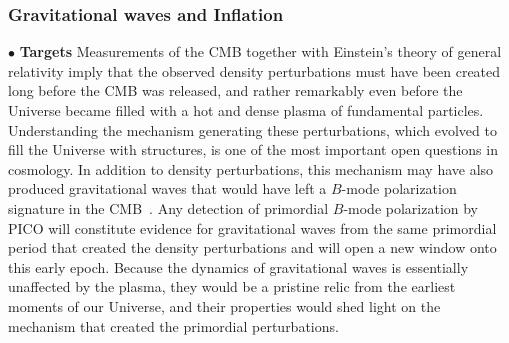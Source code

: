 \documentclass[PICOReport.tex]{subfiles}
\begin{document}
\subsubsection{Gravitational waves and Inflation}
\label{sec:inflation}

\noindent$\bullet$ {\bf Targets} \hspace{0.1in} Measurements of the \ac{CMB} together with Einstein's theory of general relativity imply that the observed density perturbations must have been created long before the \ac{CMB} was released, and rather remarkably even before the Universe became filled with a hot and dense plasma of fundamental particles. Understanding the mechanism generating these perturbations, which evolved to fill the Universe with structures, is one of the most important open questions in cosmology. In addition to density perturbations, this mechanism may have also produced gravitational waves that would have left a $B$-mode polarization signature in the CMB~\cite{Seljak:1996gy,Kamionkowski:1996zd}. 
Any detection of primordial $B$-mode polarization by PICO will constitute evidence for gravitational waves from the same primordial period that created the density perturbations and will open a new window onto this early epoch. Because the dynamics of gravitational waves is essentially unaffected by the plasma, they would be a pristine relic from the earliest moments of our Universe, and their properties would shed light on the mechanism that created the primordial perturbations. 


\end{document}
